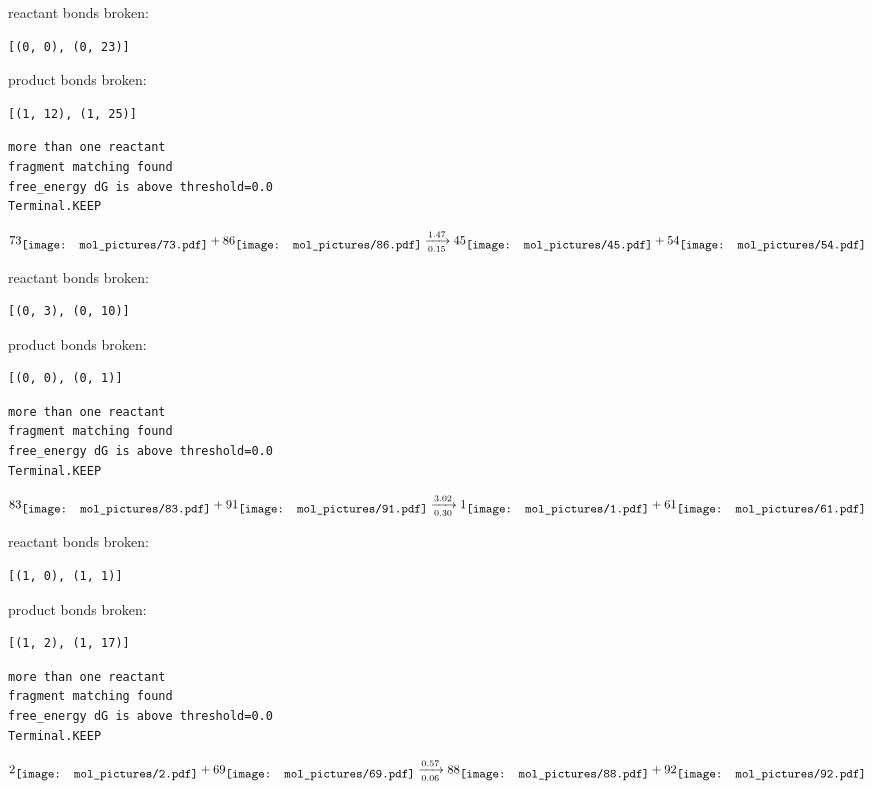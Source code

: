 \documentclass{article}
\begin{document}
reactant bonds broken:\begin{verbatim}
[(0, 0), (0, 23)]
\end{verbatim}
product bonds broken:\begin{verbatim}
[(1, 12), (1, 25)]
\end{verbatim}




\vspace{1cm}
\begin{verbatim}
more than one reactant
fragment matching found
free_energy dG is above threshold=0.0
Terminal.KEEP
\end{verbatim}
$$
73
\raisebox{-.5\height}{\texttt{[image: mol\_pictures/73.pdf]}}
+
86
\raisebox{-.5\height}{\texttt{[image: mol\_pictures/86.pdf]}}
\xrightarrow[0.15]{1.47}
45
\raisebox{-.5\height}{\texttt{[image: mol\_pictures/45.pdf]}}
+
54
\raisebox{-.5\height}{\texttt{[image: mol\_pictures/54.pdf]}}
$$


reactant bonds broken:\begin{verbatim}
[(0, 3), (0, 10)]
\end{verbatim}
product bonds broken:\begin{verbatim}
[(0, 0), (0, 1)]
\end{verbatim}




\vspace{1cm}
\begin{verbatim}
more than one reactant
fragment matching found
free_energy dG is above threshold=0.0
Terminal.KEEP
\end{verbatim}
$$
83
\raisebox{-.5\height}{\texttt{[image: mol\_pictures/83.pdf]}}
+
91
\raisebox{-.5\height}{\texttt{[image: mol\_pictures/91.pdf]}}
\xrightarrow[0.30]{3.02}
1
\raisebox{-.5\height}{\texttt{[image: mol\_pictures/1.pdf]}}
+
61
\raisebox{-.5\height}{\texttt{[image: mol\_pictures/61.pdf]}}
$$


reactant bonds broken:\begin{verbatim}
[(1, 0), (1, 1)]
\end{verbatim}
product bonds broken:\begin{verbatim}
[(1, 2), (1, 17)]
\end{verbatim}




\vspace{1cm}
\begin{verbatim}
more than one reactant
fragment matching found
free_energy dG is above threshold=0.0
Terminal.KEEP
\end{verbatim}
$$
2
\raisebox{-.5\height}{\texttt{[image: mol\_pictures/2.pdf]}}
+
69
\raisebox{-.5\height}{\texttt{[image: mol\_pictures/69.pdf]}}
\xrightarrow[0.06]{0.57}
88
\raisebox{-.5\height}{\texttt{[image: mol\_pictures/88.pdf]}}
+
92
\raisebox{-.5\height}{\texttt{[image: mol\_pictures/92.pdf]}}
$$
\end{document}
